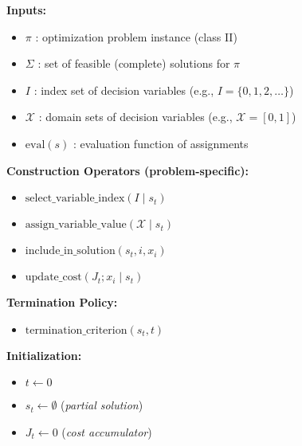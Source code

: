 \begin{tcolorbox}[colback=white, colframe=black!25, title={\textbf{Procedure:} Construction\_Metaheuristic($\pi$)}]

\textbf{Inputs:}
\begin{itemize}[noitemsep, leftmargin=2em]
    \item $\pi$ : optimization problem instance (class II)
    \item $\Sigma$ : set of feasible (complete) solutions for $\pi$
    \item $I$ : index set of decision variables (e.g., $I = \{0, 1, 2, \dots\}$)
    \item $\mathcal{X}$ : domain sets of decision variables (e.g., $\mathcal{X} = [0,1]$)
    \item $\text{eval}(s)$ : evaluation function of assignments
\end{itemize}

\vspace{0.7em}
\textbf{Construction Operators (problem-specific):}
\begin{itemize}[noitemsep, leftmargin=2em]
    \item $\text{select\_variable\_index}(I \mid s_t)$
    \item $\text{assign\_variable\_value}(\mathcal{X} \mid s_t)$
    \item $\text{include\_in\_solution}(s_t, i, x_i)$
    \item $\text{update\_cost}(J_t; x_i \mid s_t)$
\end{itemize}

\vspace{0.7em}
\textbf{Termination Policy:}
\begin{itemize}[noitemsep, leftmargin=2em]
    \item $\text{termination\_criterion}(s_t, t)$
\end{itemize}

\vspace{0.7em}
\textbf{Initialization:}
\begin{itemize}[noitemsep, leftmargin=2em]
    \item $t \gets 0$
    \item $s_t \gets \emptyset$ \hfill (\textit{partial solution})
    \item $J_t \gets 0$ \hfill (\textit{cost accumulator})
\end{itemize}


\end{tcolorbox}
